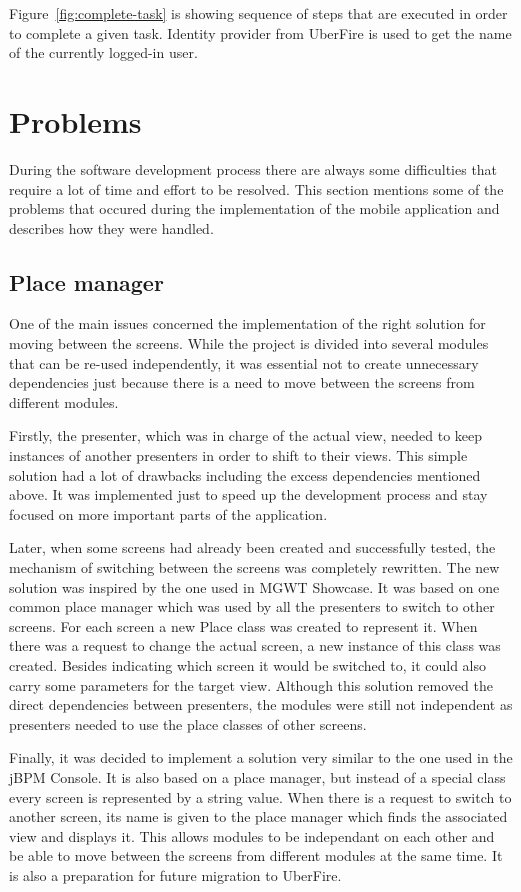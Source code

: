 \documentclass[12pt,oneside,final]{fithesis2}
\begin{document}
Figure~\ref{fig:complete-task} is showing sequence of steps that are executed in order to complete a given task.
Identity provider from UberFire is used to get the name of the currently logged-in user.

\section{Problems}
During the software development process there are always some difficulties that require a lot of time and effort to be resolved.
This section mentions some of the problems that occured during the implementation of the mobile application and describes how they were handled.

\subsection{Place manager}
One of the main issues concerned the implementation of the right solution for moving between the screens.
While the project is divided into several modules that can be re-used independently, it was essential not to create unnecessary dependencies just because there is a need to move between the screens from different modules.

Firstly, the presenter, which was in charge of the actual view, needed to keep instances of another presenters in order to shift to their views.
This simple solution had a lot of drawbacks including the excess dependencies mentioned above.
It was implemented just to speed up the development process and stay focused on more important parts of the application.

Later, when some screens had already been created and successfully tested, the mechanism of switching between the screens was completely rewritten.
The new solution was inspired by the one used in MGWT Showcase\footnotemark{}.
It was based on one common place manager which was used by all the presenters to switch to other screens.
For each screen a new Place class was created to represent it.
When there was a request to change the actual screen, a new instance of this class was created.
Besides indicating which screen it would be switched to, it could also carry some parameters for the target view.
Although this solution removed the direct dependencies between presenters, the modules were still not independent as presenters needed to use the place classes of other screens.

Finally, it was decided to implement a solution very similar to the one used in the jBPM Console.
It is also based on a place manager, but instead of a special class every screen is represented by a string value.
When there is a request to switch to another screen, its name is given to the place manager which finds the associated view and displays it.
This allows modules to be independant on each other and be able to move between the screens from different modules at the same time.
It is also a preparation for future migration to UberFire.
\end{document}
